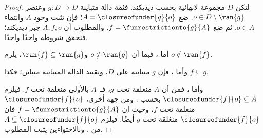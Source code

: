 \documentclass[../../../include/open-logic-section]{subfiles}
\begin{document}
\begin{proof}
لتكن $D$ مجموعة لانهائية بحسب ديديكند. فثمة دالة متباينة $g \colon D \to
D$ وعنصر $o  \in D \setminus \ran{g}$. ضع $A =
\closureofunder{g}{o}$؛ فإن  تثبت وجود $A$ وانتماء
$o \in A$. ثم ضع $f =
\funrestrictionto{g}{A}$. والمطلوب أن $A, f, o$ جبر ديديكند؛ فنحقق شروطه واحدًا واحدًا.

أما ، فبما أن $o \notin \ran{g}$ و$\ran{f}
\subseteq \ran{g}$، يلزم $o\notin \ran{f}$.

وأما ، فإن $g$ متباينة على $D$، وتقييد الدالة المتباينة متباين؛ فكذا $f \subseteq g$.

وأما ، فمن  أن $A$ منغلقة تحت $g$، فـ~$A$ بالأولى منغلقة تحت $f$. فيلزم
$\closureofunder{f}{o} \subseteq A$ بحسب .
ومن جهة أخرى، $\closureofunder{f}{o}$ منغلقة تحت $f$، وحيث إن $f =
\funrestrictionto{g}{A}$ فإن $\closureofunder{f}{o}$ منغلقة تحت $g$ أيضًا. فيلزم
$A \subseteq \closureofunder{f}{o}$ من
. وبالاحتواءين يثبت المطلوب.
\end{proof}
\end{document}
